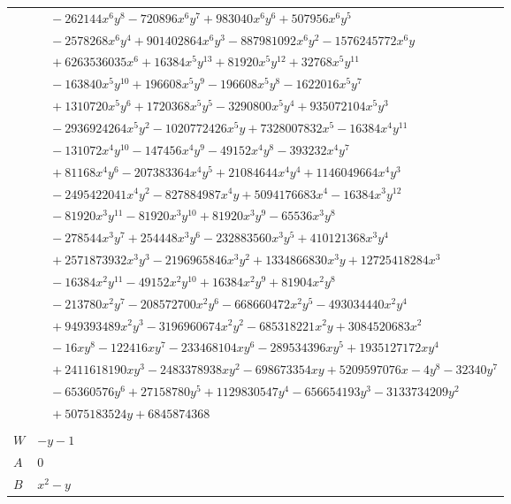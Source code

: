 \documentclass[11pt]{article}
\begin{document}
\begin{longtable}{@{}ll@{}}
 & $\quad -262144x^{6}y^{8}-720896x^{6}y^{7}+983040x^{6}y^{6}+507956x^{6}y^{5}$\\
 & $\quad -2578268x^{6}y^{4}+901402864x^{6}y^{3}-887981092x^{6}y^{2}-1576245772x^{6}y$\\
 & $\quad +6263536035x^{6}+16384x^{5}y^{13}+81920x^{5}y^{12}+32768x^{5}y^{11}$\\
 & $\quad -163840x^{5}y^{10}+196608x^{5}y^{9}-196608x^{5}y^{8}-1622016x^{5}y^{7}$\\
 & $\quad +1310720x^{5}y^{6}+1720368x^{5}y^{5}-3290800x^{5}y^{4}+935072104x^{5}y^{3}$\\
 & $\quad -2936924264x^{5}y^{2}-1020772426x^{5}y+7328007832x^{5}-16384x^{4}y^{11}$\\
 & $\quad -131072x^{4}y^{10}-147456x^{4}y^{9}-49152x^{4}y^{8}-393232x^{4}y^{7}$\\
 & $\quad +81168x^{4}y^{6}-207383364x^{4}y^{5}+21084644x^{4}y^{4}+1146049664x^{4}y^{3}$\\
 & $\quad -2495422041x^{4}y^{2}-827884987x^{4}y+5094176683x^{4}-16384x^{3}y^{12}$\\
 & $\quad -81920x^{3}y^{11}-81920x^{3}y^{10}+81920x^{3}y^{9}-65536x^{3}y^{8}$\\
 & $\quad -278544x^{3}y^{7}+254448x^{3}y^{6}-232883560x^{3}y^{5}+410121368x^{3}y^{4}$\\
 & $\quad +2571873932x^{3}y^{3}-2196965846x^{3}y^{2}+1334866830x^{3}y+12725418284x^{3}$\\
 & $\quad -16384x^{2}y^{11}-49152x^{2}y^{10}+16384x^{2}y^{9}+81904x^{2}y^{8}$\\
 & $\quad -213780x^{2}y^{7}-208572700x^{2}y^{6}-668660472x^{2}y^{5}-493034440x^{2}y^{4}$\\
 & $\quad +949393489x^{2}y^{3}-3196960674x^{2}y^{2}-685318221x^{2}y+3084520683x^{2}$\\
 & $\quad -16xy^{8}-122416xy^{7}-233468104xy^{6}-289534396xy^{5}+1935127172xy^{4}$\\
 & $\quad +2411618190xy^{3}-2483378938xy^{2}-698673354xy+5209597076x-4y^{8}-32340y^{7}$\\
 & $\quad -65360576y^{6}+27158780y^{5}+1129830547y^{4}-656654193y^{3}-3133734209y^{2}$\\
 & $\quad +5075183524y+6845874368$\\
\addlinespace[3pt]
\multicolumn{2}{@{}l}{$i=24$, $m=1$, neighbours $23$}\\
$W$ & $-y-1$\\
$A$ & $0$\\
$B$ & $x^{2}-y$\\

\end{longtable}
\end{document}
